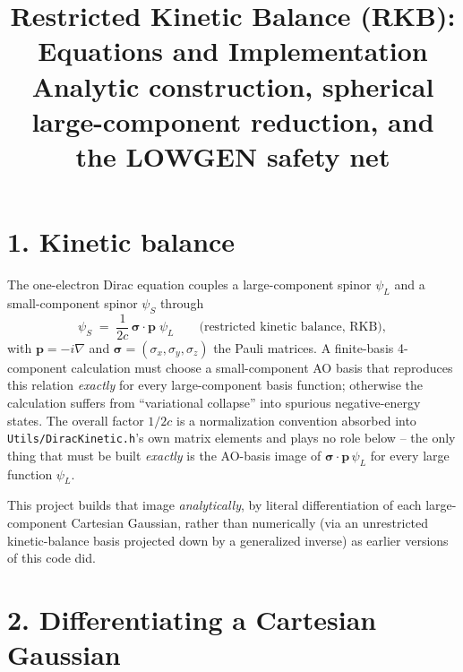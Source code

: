 \documentclass[11pt]{article}
\title{Restricted Kinetic Balance (RKB): Equations and Implementation\\
\large Analytic construction, spherical large-component reduction, and the LOWGEN safety net}
\author{}
\date{}
\newcommand{\bs}[1]{\boldsymbol{#1}}
\begin{document}
\sloppy
\maketitle

\section*{1. Kinetic balance}

The one-electron Dirac equation couples a large-component spinor $\psi_L$ and a small-component
spinor $\psi_S$ through
\begin{equation}
\psi_S \;=\; \frac{1}{2c}\,\bs\sigma\!\cdot\!\bs p\;\psi_L
\qquad\text{(restricted kinetic balance, RKB)},
\end{equation}
with $\bs p = -i\nabla$ and $\bs\sigma=(\sigma_x,\sigma_y,\sigma_z)$ the Pauli matrices. A
finite-basis 4-component calculation must choose a small-component AO basis that reproduces this
relation \emph{exactly} for every large-component basis function; otherwise the calculation
suffers from ``variational collapse'' into spurious negative-energy states. The overall factor
$1/2c$ is a normalization convention absorbed into \texttt{Utils/DiracKinetic.h}'s own matrix
elements and plays no role below -- the only thing that must be built \emph{exactly} is the
AO-basis image of $\bs\sigma\!\cdot\!\bs p\,\psi_L$ for every large function $\psi_L$.

This project builds that image \emph{analytically}, by literal differentiation of each
large-component Cartesian Gaussian, rather than numerically (via an unrestricted kinetic-balance
basis projected down by a generalized inverse) as earlier versions of this code did.

\section*{2. Differentiating a Cartesian Gaussian}
\end{document}

